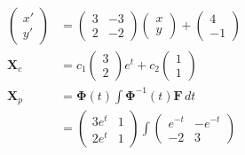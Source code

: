 \documentclass{article}
\begin{document}
\setcounter{subsubsection}{12}
\subsubsection{}

\begin{align*}
  \begin{pmatrix}
    x' \\
    y'
  \end{pmatrix} & = \begin{pmatrix}
                      3 & -3 \\
                      2 & -2
                    \end{pmatrix} \begin{pmatrix}
                                    x \\
                                    y
                                  \end{pmatrix} + \begin{pmatrix}
                                                    4 \\
                                                    -1
                                                  \end{pmatrix}                  \\
  \mathbf{X}_c    & = c_1 \begin{pmatrix}
                            3 \\
                            2
                          \end{pmatrix} e^t + c_2 \begin{pmatrix}
                                                    1 \\
                                                    1
                                                  \end{pmatrix}                  \\
  \mathbf{X}_p    & = \mathbf{\Phi}(t) \int \mathbf{\Phi}^{-1}(t) \mathbf{F} \,dt \\
                  & = \begin{pmatrix}
                        3 e^t & 1 \\
                        2 e^t & 1
                      \end{pmatrix} \int \begin{pmatrix}
                                           e^{-t} & -e^{-t} \\
                                           -2     & 3

\end{pmatrix}
\end{align*}
\end{document}
